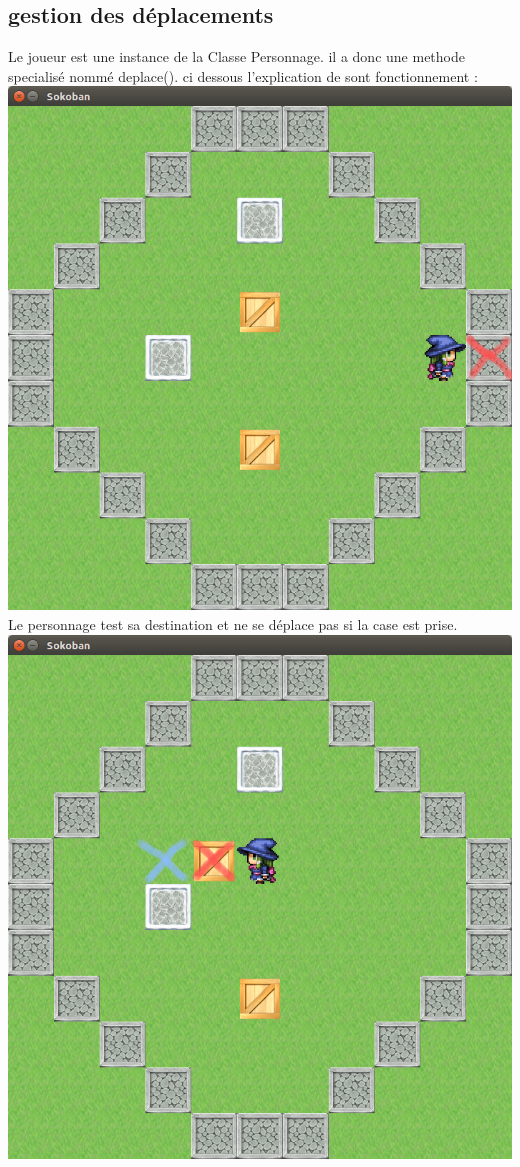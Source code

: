 \documentclass{article}
\begin{document}
	\subsection{gestion des déplacements}
	Le joueur est une instance de la Classe Personnage. il a donc une methode specialisé nommé deplace(). ci dessous l'explication de sont fonctionnement :
	\includegraphics[scale=0.25]{01.png}
	\newline
	Le personnage test sa destination et ne se déplace pas si la case est prise.
	\includegraphics[scale=0.25]{02.png}
\end{document}
